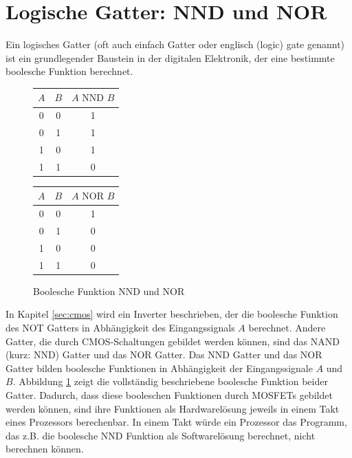 \documentclass{scrarticle}
\numberwithin{equation}{section}
\begin{document}
\section{Logische Gatter: NND und NOR}
Ein logisches Gatter (oft auch einfach Gatter oder englisch (logic) gate genannt) ist ein grundlegender Baustein in der digitalen Elektronik, der eine bestimmte boolesche Funktion berechnet.
\begin{figure}[ht]
	\begin{minipage}[t]{0.5\textwidth}
		\centering
		\begin{tabular}{c|c||c}
			\hline
			$A$ & $B$ & $A \text{ NND } B$ \\
			\hline\hline
			0 & 0 & 1 \\
			0 & 1 & 1 \\
			1 & 0 & 1 \\
			1 & 1 & 0 \\
			\hline
		\end{tabular}
	\end{minipage}
	\hfill %
	\begin{minipage}[t]{0.5\textwidth}
		\centering
		\begin{tabular}{c|c||c}
			\hline
			$A$ & $B$ & $A \text{ NOR } B$ \\
			\hline\hline
			0 & 0 & 1 \\
			0 & 1 & 0 \\
			1 & 0 & 0 \\
			1 & 1 & 0 \\
			\hline
		\end{tabular}
	\end{minipage}
	\caption{Boolesche Funktion NND und NOR}
\label{fig:nand-nor}
\end{figure}
In Kapitel \ref{sec:cmos} wird ein Inverter beschrieben, der die boolesche Funktion des NOT Gatters in Abhängigkeit des Eingangssignals $A$ berechnet. Andere Gatter, die durch CMOS-Schaltungen gebildet werden können, sind das NAND (kurz: NND) Gatter und das NOR Gatter. Das NND Gatter und das NOR Gatter bilden boolesche Funktionen in Abhängigkeit der Eingangssignale $A$ und $B$. Abbildung \ref{fig:nand-nor} zeigt die vollständig beschriebene boolesche Funktion beider Gatter. Dadurch, dass diese booleschen Funktionen durch MOSFETs gebildet werden können, sind ihre Funktionen als Hardwarelösung jeweils in einem Takt eines Prozessors berechenbar. In einem Takt würde ein Prozessor das Programm, das z.B. die boolesche NND Funktion als Softwarelösung berechnet, nicht berechnen können.
\end{document}
